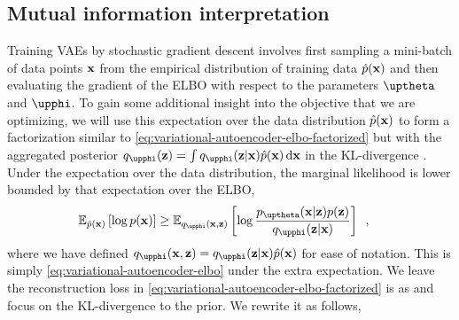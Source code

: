 \subsection{Mutual information interpretation} \label{subsec: mutual-information-interpretation-of-elbo}
Training VAEs by stochastic gradient descent involves first sampling a mini-batch of data points ${\mathbf{x}}$ from the empirical distribution of training data $\hat{p}({\mathbf{x}})$ and then evaluating the gradient of the ELBO with respect to the parameters $\thetab$ and $\phib$. 
To gain some additional insight into the objective that we are optimizing, we will use this expectation over the data distribution $\hat{p}({\mathbf{x}})$ to form a factorization similar to \cref{eq:variational-autoencoder-elbo-factorized} but with the aggregated posterior $q_\phib(\zb) = \int q_\phib(\zb|\xb)\hat{p}(\xb)\,\mathrm{d}\xb$ in the KL-divergence \parencite{tomczak_trouble_2022}. 
Under the expectation over the data distribution, the marginal likelihood is lower bounded by that expectation over the ELBO,
%
\begin{align} \label{eq:variational-autoencoder-elbo-expected}
    \mathbb{E}_{\hat{p}(\xb)}\left[ \log p(\xb) \right] 
    &\geq \mathbb{E}_{q_{\phib}(\xb,\zb)}\left[ \log \frac{p_{\thetab}(\xb|\zb)p(\zb)}{q_{\phib}(\zb|\xb)} \right] \enspace ,
\end{align}
%
where we have defined $q_{\phib}(\xb,\zb) = q_{\phib}(\zb|\xb)\hat{p}(\xb)$ for ease of notation. This is simply \cref{eq:variational-autoencoder-elbo} under the extra expectation. 
We leave the reconstruction loss in \cref{eq:variational-autoencoder-elbo-factorized} is as and focus on the KL-divergence to the prior. We rewrite it as follows,
%
